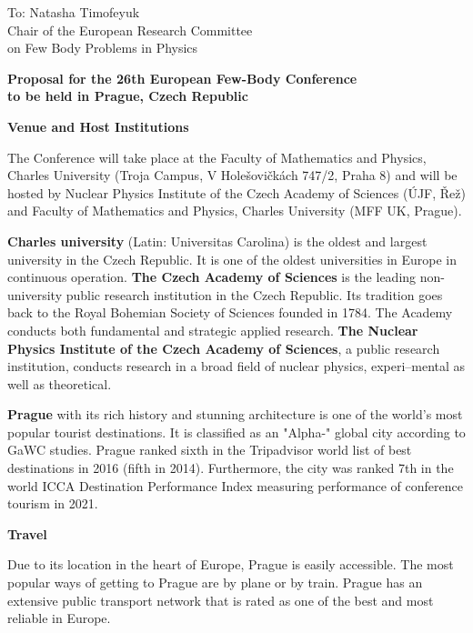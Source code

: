 \documentclass{article}[14pt]
\begin{document}
\noindent
To: Natasha Timofeyuk \\
Chair of the European Research Committee \\
on Few Body Problems in Physics 
\vspace{5mm}

\begin{center}
{\bf \Large
Proposal for the 26th European Few-Body Conference \\ [1mm]
to be held in Prague, Czech Republic}
\end{center}
\vspace{5mm}

\begin{center}
{\bf \large Venue and Host Institutions}
\end{center}

The Conference will take place at the Faculty of Mathematics and Physics, Charles University
(Troja Campus, V Holešovičkách 747/2, Praha 8) and will be hosted by Nuclear Physics Institute
of the Czech Academy of Sciences (ÚJF, Řež) and Faculty of Mathematics and Physics, Charles University
(MFF UK, Prague).

{\bf Charles university} (Latin: Universitas Carolina) is the oldest and largest university in the Czech Republic. It is one
of the oldest universities in Europe in continuous operation. {\bf The Czech Academy of Sciences} is the leading
non-university public research institution in the Czech Republic. Its tradition goes back to the Royal Bohemian
Society of Sciences founded in 1784. The Academy conducts both fundamental and strategic applied research.
{\bf The Nuclear Physics Institute of the Czech Academy of Sciences}, a public research institution, conducts research
in a broad field of nuclear physics, experi--mental as well as theoretical.

{\bf Prague} with its rich history and stunning architecture is one of the world's most popular tourist destinations.
It is classified as an "Alpha-" global city according to GaWC studies. Prague ranked sixth in the Tripadvisor world list of best
destinations in 2016 (fifth in 2014). Furthermore, the city was ranked 7th in the world ICCA Destination Performance Index
measuring performance of conference tourism in 2021.


\begin{center}
{\bf \large Travel}
\end{center}

Due to its location in the heart of Europe, Prague is easily accessible. The most popular ways of getting to Prague are
 by plane or by train. Prague has an extensive public transport network that is rated as one of the best and most reliable
in Europe.
\end{document}
